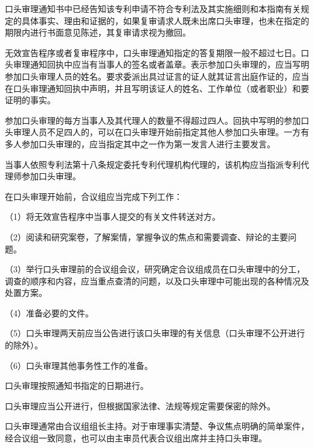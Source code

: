 口头审理通知书中已经告知该专利申请不符合专利法及其实施细则和本指南有关规定的具体事实、理由和证据的，如果复审请求人既未出席口头审理，也未在指定的期限内进行书面意见陈述，其复审请求视为撤回。

无效宣告程序或者复审程序中，口头审理通知指定的答复期限一般不超过七日。口头审理通知回执中应当有当事人的签名或者盖章。表示参加口头审理的，应当写明参加口头审理人员的姓名。要求委派出具过证言的证人就其证言出庭作证的，应当在口头审理通知回执中声明，并且写明该证人的姓名、工作单位（或者职业）和要证明的事实。

参加口头审理的每方当事人及其代理人的数量不得超过四人。回执中写明的参加口头审理人员不足四人的，可以在口头审理开始前指定其他人参加口头审理。一方有多人参加口头审理的，应当指定其中之一作为第一发言人进行主要发言。

当事人依照专利法第十八条规定委托专利代理机构代理的，该机构应当指派专利代理师参加口头审理。

在口头审理开始前，合议组应当完成下列工作：

{\setlength{\parindent}{17.1bp}（1）将无效宣告程序中当事人提交的有关文件转送对方。\par}

{\setlength{\parindent}{17.1bp}（2）阅读和研究案卷，了解案情，掌握争议的焦点和需要调查、辩论的主要问题。\par}

{\setlength{\parindent}{17.1bp}（3）举行口头审理前的合议组会议，研究确定合议组成员在口头审理中的分工，调查的顺序和内容，应当重点查清的问题，以及口头审理中可能出现的各种情况及处置方案。\par}

{\setlength{\parindent}{17.1bp}（4）准备必要的文件。\par}

{\setlength{\parindent}{17.1bp}（5）口头审理两天前应当公告进行该口头审理的有关信息（口头审理不公开进行的除外）。\par}

{\setlength{\parindent}{17.1bp}（6）口头审理其他事务性工作的准备。\par}

口头审理按照通知书指定的日期进行。

口头审理应当公开进行，但根据国家法律、法规等规定需要保密的除外。

口头审理通常由合议组组长主持。对于审理事实清楚、争议焦点明确的简单案件，经合议组一致同意，也可以由主审员代表合议组出席并主持口头审理。


